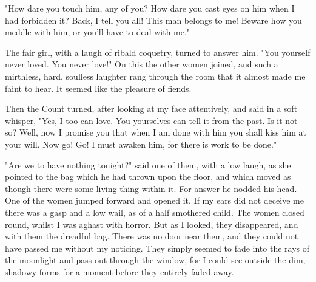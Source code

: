 \documentclass[10pt,a4paper]{article}
\begin{document}
"How dare you touch him, any of you? How dare you cast eyes on him when I had forbidden it? Back, I tell you all! This man belongs to me! Beware how you meddle with him, or you'll have to deal with me."

The fair girl, with a laugh of ribald coquetry, turned to answer him. "You yourself never loved. You never love!" On this the other women joined, and such a mirthless, hard, soulless laughter rang through the room that it almost made me faint to hear. It seemed like the pleasure of fiends.

Then the Count turned, after looking at my face attentively, and said in a soft whisper, "Yes, I too can love. You yourselves can tell it from the past. Is it not so? Well, now I promise you that when I am done with him you shall kiss him at your will. Now go! Go! I must awaken him, for there is work to be done."

"Are we to have nothing tonight?" said one of them, with a low laugh, as she pointed to the bag which he had thrown upon the floor, and which moved as though there were some living thing within it. For answer he nodded his head. One of the women jumped forward and opened it. If my ears did not deceive me there was a gasp and a low wail, as of a half smothered child. The women closed round, whilst I was aghast with horror. But as I looked, they disappeared, and with them the dreadful bag. There was no door near them, and they could not have passed me without my noticing. They simply seemed to fade into the rays of the moonlight and pass out through the window, for I could see outside the dim, shadowy forms for a moment before they entirely faded away.
\end{document}
